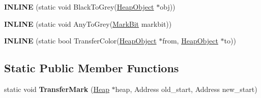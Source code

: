 \begin{DoxyCompactItemize}
\item 
{\bfseries I\+N\+L\+I\+NE} (static void Black\+To\+Grey(\hyperlink{classv8_1_1internal_1_1_heap_object}{Heap\+Object} $\ast$obj))\hypertarget{classv8_1_1internal_1_1_marking_a164bd777001f51d92cb8f4949704dd00}{}\label{classv8_1_1internal_1_1_marking_a164bd777001f51d92cb8f4949704dd00}

\item 
{\bfseries I\+N\+L\+I\+NE} (static void Any\+To\+Grey(\hyperlink{classv8_1_1internal_1_1_mark_bit}{Mark\+Bit} markbit))\hypertarget{classv8_1_1internal_1_1_marking_ae4e5878bc1eeca2ada2b97793fa5fc4b}{}\label{classv8_1_1internal_1_1_marking_ae4e5878bc1eeca2ada2b97793fa5fc4b}

\item 
{\bfseries I\+N\+L\+I\+NE} (static bool Transfer\+Color(\hyperlink{classv8_1_1internal_1_1_heap_object}{Heap\+Object} $\ast$from, \hyperlink{classv8_1_1internal_1_1_heap_object}{Heap\+Object} $\ast$to))\hypertarget{classv8_1_1internal_1_1_marking_ace5f36b2741224a982aa385ba26dfa1c}{}\label{classv8_1_1internal_1_1_marking_ace5f36b2741224a982aa385ba26dfa1c}

\end{DoxyCompactItemize}
\subsection*{Static Public Member Functions}
\begin{DoxyCompactItemize}
\item 
static void {\bfseries Transfer\+Mark} (\hyperlink{classv8_1_1internal_1_1_heap}{Heap} $\ast$heap, Address old\+\_\+start, Address new\+\_\+start)\hypertarget{classv8_1_1internal_1_1_marking_aeaef033a942cce2907e5b3030067849a}{}\label{classv8_1_1internal_1_1_marking_aeaef033a942cce2907e5b3030067849a}

\end{DoxyCompactItemize}
